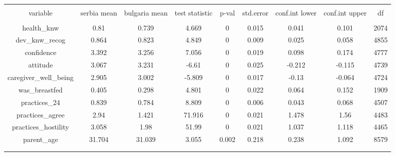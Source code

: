 
\begin{table}[!htbp] \centering 
  \caption{} 
  \label{tbl:country_baseline_constructs_imbalance} 
\begin{tabular}{@{\extracolsep{5pt}} ccccccccc} 
\\[-1.8ex]\hline 
\hline \\[-1.8ex] 
variable & serbia mean & bulgaria mean & test statistic & p-val & std.error & conf.int lower & conf.int upper & df \\ 
\hline \\[-1.8ex] 
health\_knw & 0.81 & 0.739 & 4.669 & 0 & 0.015 & 0.041 & 0.101 & 2074 \\ 
dev\_knw\_recog & 0.864 & 0.823 & 4.849 & 0 & 0.009 & 0.025 & 0.058 & 4855 \\ 
confidence & 3.392 & 3.256 & 7.056 & 0 & 0.019 & 0.098 & 0.174 & 4777 \\ 
attitude & 3.067 & 3.231 & -6.61 & 0 & 0.025 & -0.212 & -0.115 & 4739 \\ 
caregiver\_well\_being & 2.905 & 3.002 & -5.809 & 0 & 0.017 & -0.13 & -0.064 & 4724 \\ 
was\_breastfed & 0.405 & 0.298 & 4.801 & 0 & 0.022 & 0.064 & 0.152 & 1909 \\ 
practices\_24 & 0.839 & 0.784 & 8.809 & 0 & 0.006 & 0.043 & 0.068 & 4507 \\ 
practices\_agree & 2.94 & 1.421 & 71.916 & 0 & 0.021 & 1.478 & 1.56 & 4483 \\ 
practices\_hostility & 3.058 & 1.98 & 51.99 & 0 & 0.021 & 1.037 & 1.118 & 4465 \\ 
parent\_age & 31.704 & 31.039 & 3.055 & 0.002 & 0.218 & 0.238 & 1.092 & 8579 \\ 
 &  &  &  &  &  &  &  &  \\ 
\hline \\[-1.8ex] 
\end{tabular} 
\end{table} 
